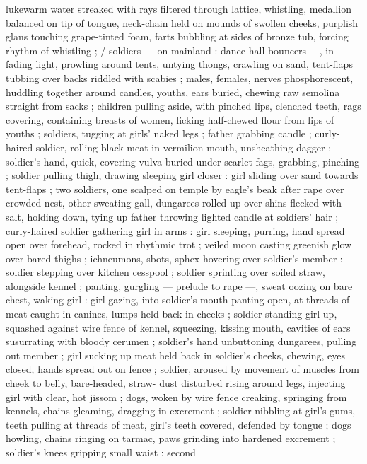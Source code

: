 lukewarm water streaked with rays filtered through lattice, whistling,
medallion balanced on tip of tongue, neck-chain held on mounds of
swollen cheeks, purplish glans touching grape-tinted foam, farts
bubbling at sides of bronze tub, forcing rhythm of whistling ; /
soldiers --- on mainland : dance-hall bouncers ---, in fading light,
prowling around tents, untying thongs, crawling on sand, tent-flaps
tubbing over backs riddled with scabies ; males, females, nerves
phosphorescent, huddling together around candles, youths, ears
buried, chewing raw semolina straight from sacks ; children pulling
aside, with pinched lips, clenched teeth, rags covering, containing
breasts of women, licking half-chewed flour from lips of youths ;
soldiers, tugging at girls’ naked legs ; father grabbing candle ; curly-
haired soldier, rolling black meat in vermilion mouth, unsheathing
dagger : soldier's hand, quick, covering vulva buried under scarlet
fags, grabbing, pinching ; soldier pulling thigh, drawing sleeping girl
closer : girl sliding over sand towards tent-flaps ; two soldiers, one %
scalped on temple by eagle's beak after rape over crowded nest,
other sweating gall, dungarees rolled up over shins flecked with salt,
holding down, tying up father throwing lighted candle at soldiers’
hair ; curly-haired soldier gathering girl in arms : girl sleeping,
purring, hand spread open over forehead, rocked in rhythmic trot ;
veiled moon casting greenish glow over bared thighs ; ichneumons,
sbots, sphex hovering over soldier's member : soldier stepping over
kitchen cesspool ; soldier sprinting over soiled straw, alongside
kennel ; panting, gurgling --- prelude to rape ---, sweat oozing on
bare chest, waking girl : girl gazing, into soldier's mouth panting
open, at threads of meat caught in canines, lumps held back in
cheeks ; soldier standing girl up, squashed against wire fence of
kennel, squeezing, kissing mouth, cavities of ears susurrating with
bloody cerumen ; soldier's hand unbuttoning dungarees, pulling out
member ; girl sucking up meat held back in soldier's cheeks,
chewing, eyes closed, hands spread out on fence ; soldier, aroused
by movement of muscles from cheek to belly, bare-headed, straw-
dust disturbed rising around legs, injecting girl with clear, hot jissom
; dogs, woken by wire fence creaking, springing from kennels, chains
gleaming, dragging in excrement ; soldier nibbling at girl's gums,
teeth pulling at threads of meat, girl's teeth covered, defended by
tongue ; dogs howling, chains ringing on tarmac, paws grinding into
hardened excrement ; soldier's knees gripping small waist : second
